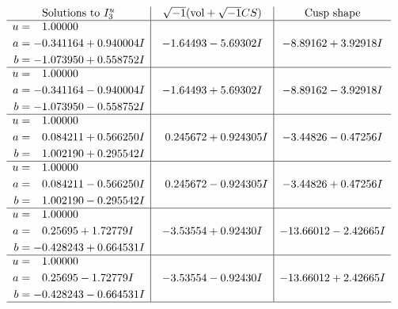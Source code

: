 \documentclass[1p]{elsarticle_modified}
\theoremstyle{definition}
\newcommand{\I}{\sqrt{-1}}
\begin{document}
$$\begin{array}{c|c|c}  
\text{Solutions to }I^u_{3}& \I (\text{vol} + \sqrt{-1}CS) & \text{Cusp shape}\\
 \hline 
\begin{aligned}
u &= \phantom{-}1.00000\phantom{ +0.000000I} \\
a &= -0.341164 + 0.940004 I \\
b &= -1.073950 + 0.558752 I\end{aligned}
 & -1.64493 - 5.69302 I & -8.89162 + 3.92918 I \\ \hline\begin{aligned}
u &= \phantom{-}1.00000\phantom{ +0.000000I} \\
a &= -0.341164 - 0.940004 I \\
b &= -1.073950 - 0.558752 I\end{aligned}
 & -1.64493 + 5.69302 I & -8.89162 - 3.92918 I \\ \hline\begin{aligned}
u &= \phantom{-}1.00000\phantom{ +0.000000I} \\
a &= \phantom{-}0.084211 + 0.566250 I \\
b &= \phantom{-}1.002190 + 0.295542 I\end{aligned}
 & \phantom{-}0.245672 + 0.924305 I & -3.44826 - 0.47256 I \\ \hline\begin{aligned}
u &= \phantom{-}1.00000\phantom{ +0.000000I} \\
a &= \phantom{-}0.084211 - 0.566250 I \\
b &= \phantom{-}1.002190 - 0.295542 I\end{aligned}
 & \phantom{-}0.245672 - 0.924305 I & -3.44826 + 0.47256 I \\ \hline\begin{aligned}
u &= \phantom{-}1.00000\phantom{ +0.000000I} \\
a &= \phantom{-}0.25695 + 1.72779 I \\
b &= -0.428243 + 0.664531 I\end{aligned}
 & -3.53554 + 0.92430 I & -13.66012 - 2.42665 I \\ \hline\begin{aligned}
u &= \phantom{-}1.00000\phantom{ +0.000000I} \\
a &= \phantom{-}0.25695 - 1.72779 I \\
b &= -0.428243 - 0.664531 I\end{aligned}
 & -3.53554 - 0.92430 I & -13.66012 + 2.42665 I\\
 \hline 
 \end{array}$$\newpage
\end{document}
